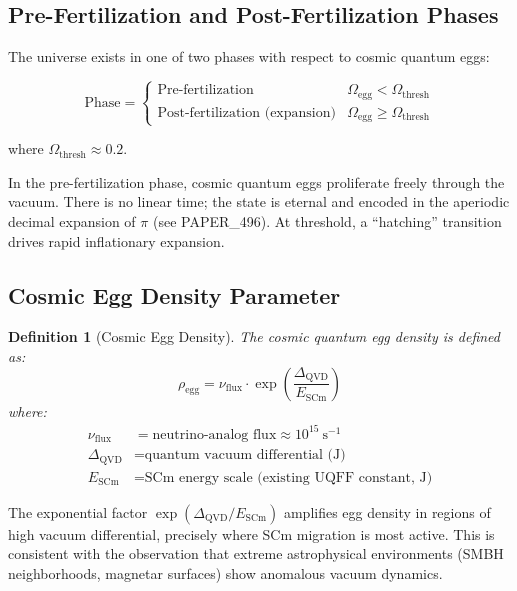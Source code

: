 \documentclass[12pt]{article}
\newtheorem{definition}{Definition}
\begin{document}
\subsection{Pre-Fertilization and Post-Fertilization Phases}

The universe exists in one of two phases with respect to cosmic quantum eggs:

\[
\text{Phase} =
\begin{cases}
    \text{Pre-fertilization} & \Omega_\text{egg} < \Omega_\text{thresh} \\[4pt]
    \text{Post-fertilization (expansion)} & \Omega_\text{egg} \geq \Omega_\text{thresh}
\end{cases}
\]

where $\Omega_\text{thresh} \approx 0.2$.

In the pre-fertilization phase, cosmic quantum eggs proliferate freely through
the vacuum. There is no linear time; the state is eternal and encoded in the
aperiodic decimal expansion of $\pi$ (see PAPER\_496). At threshold, a
``hatching'' transition drives rapid inflationary expansion.

\subsection{Cosmic Egg Density Parameter}

\begin{definition}[Cosmic Egg Density]
The cosmic quantum egg density is defined as:
\begin{equation}
    \boxed{\rho_\text{egg} = \nu_\text{flux} \cdot \exp\!\left(\frac{\Delta_\text{QVD}}{E_\text{SCm}}\right)}
    \label{eq:rho_egg}
\end{equation}
where:
\begin{align*}
    \nu_\text{flux} &= \text{neutrino-analog flux} \approx 10^{15}\ \text{s}^{-1} \\
    \Delta_\text{QVD} &= \text{quantum vacuum differential (J)} \\
    E_\text{SCm} &= \text{SCm energy scale (existing UQFF constant, J)}
\end{align*}
\end{definition}

The exponential factor $\exp(\Delta_\text{QVD}/E_\text{SCm})$ amplifies egg
density in regions of high vacuum differential, precisely where SCm migration
is most active. This is consistent with the observation that extreme
astrophysical environments (SMBH neighborhoods, magnetar surfaces) show
anomalous vacuum dynamics.
\end{document}
